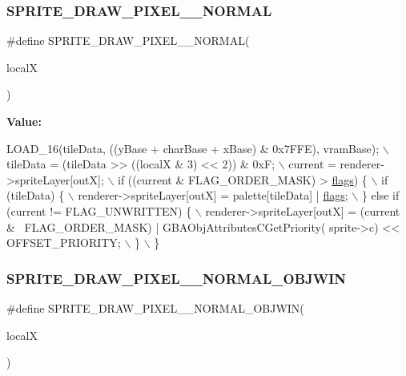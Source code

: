 \subsubsection{\texorpdfstring{S\+P\+R\+I\+T\+E\+\_\+\+D\+R\+A\+W\+\_\+\+P\+I\+X\+E\+L\+\_\+\_\+\+N\+O\+R\+M\+AL}{SPRITE\_DRAW\_PIXEL\_16\_NORMAL}}
{\footnotesize\ttfamily \#define S\+P\+R\+I\+T\+E\+\_\+\+D\+R\+A\+W\+\_\+\+P\+I\+X\+E\+L\+\_\+\_\+\+N\+O\+R\+M\+AL(\begin{DoxyParamCaption}\item[{}]{localX }\end{DoxyParamCaption})}

{\bfseries Value\+:}
\begin{DoxyCode}
LOAD\_16(tileData, ((yBase + charBase + xBase) & 0x7FFE), vramBase); \(\backslash\)
    tileData = (tileData >> ((localX & 3) << 2)) & 0xF; \(\backslash\)
    current = renderer->spriteLayer[outX]; \(\backslash\)
    if ((current & FLAG\_ORDER\_MASK) > \mbox{\hyperlink{lr35902_2decoder_8c_a11f29eea941556f0630cfd3285f565c0}{flags}}) \{ \(\backslash\)
        if (tileData) \{ \(\backslash\)
            renderer->spriteLayer[outX] = palette[tileData] | \mbox{\hyperlink{lr35902_2decoder_8c_a11f29eea941556f0630cfd3285f565c0}{flags}}; \(\backslash\)
        \} \textcolor{keywordflow}{else} \textcolor{keywordflow}{if} (current != FLAG\_UNWRITTEN) \{ \(\backslash\)
            renderer->spriteLayer[outX] = (current & ~FLAG\_ORDER\_MASK) | GBAObjAttributesCGetPriority(
      sprite->c) << OFFSET\_PRIORITY; \(\backslash\)
        \} \(\backslash\)
    \}
\end{DoxyCode}
\mbox{\label{software-obj_8c_a0c23d6dcd315efefa9605c43ebc0aa13}} 
\subsubsection{\texorpdfstring{S\+P\+R\+I\+T\+E\+\_\+\+D\+R\+A\+W\+\_\+\+P\+I\+X\+E\+L\+\_\+\_\+\+N\+O\+R\+M\+A\+L\+\_\+\+O\+B\+J\+W\+IN}{SPRITE\_DRAW\_PIXEL\_16\_NORMAL\_OBJWIN}}
{\footnotesize\ttfamily \#define S\+P\+R\+I\+T\+E\+\_\+\+D\+R\+A\+W\+\_\+\+P\+I\+X\+E\+L\+\_\+\_\+\+N\+O\+R\+M\+A\+L\+\_\+\+O\+B\+J\+W\+IN(\begin{DoxyParamCaption}\item[{}]{localX }\end{DoxyParamCaption})}

